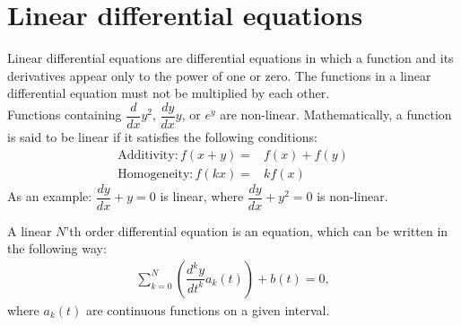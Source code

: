 \section{Linear differential equations}
Linear differential equations are differential equations in which a function and its derivatives appear only to the power of one or zero. The functions in a linear differential equation must not be multiplied by each other.
\\
Functions containing $\dfrac{d}{dx}y^2$, $\dfrac{dy}{dx}y$, or $e^y$ are non-linear. Mathematically, a function is said to be linear if it satisfies the following conditions:
\begin{align*}
\text{Additivity}:
f(x+y)=&f(x)+f(y)
\\
\text{Homogeneity}:
f(kx)=&kf(x)
\end{align*}
As an example: $\dfrac{dy}{dx}+y=0$ is linear, where $\dfrac{dy}{dx}+y^2=0$ is non-linear.
\begin{tcolorbox}[colback=blue!5!white,colframe=blue!75!black,title=Definition: $N$'th order linear differential equation]
A linear $N$'th order differential equation is an equation, which can be written in the following way:
\begin{align*}
\sum_{k=0}^{N}\left(\dfrac{d^ky}{dt^k}a_k(t)\right)+b(t)=0,
\end{align*}
where $a_k(t)$ are continuous functions on a given interval.  
\end{tcolorbox}
